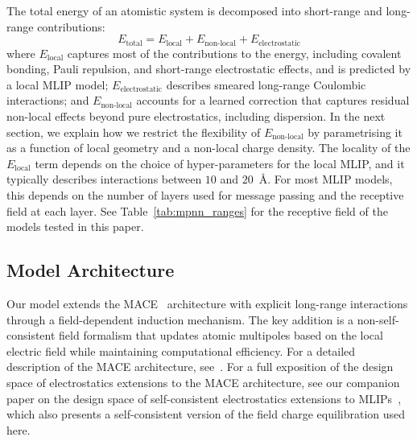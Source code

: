 \documentclass[aps,%
superscriptaddress,
 amsmath,amssymb,
floatfix,
twocolumn
]{revtex4-2}
\begin{document}
The total energy of an atomistic system is decomposed into short-range and long-range contributions:
\begin{equation}
E_{\text{total}} = E_{\text{local}} + E_{\text{non-local}} + E_{\text{electrostatic}}
\end{equation}
where $E_{\text{local}}$ captures most of the contributions to the energy, including covalent bonding, Pauli repulsion, and short-range electrostatic effects, and is predicted by a local MLIP model; $E_{\text{electrostatic}}$ describes smeared long-range Coulombic interactions; and $E_{\text{non-local}}$ accounts for a learned correction that captures residual non-local effects beyond pure electrostatics, including dispersion. In the next section, we explain how we restrict the flexibility of $E_{\text{non-local}}$ by parametrising it as a function of local geometry and a non-local charge density. The locality of the $E_{\text{local}}$ term depends on the choice of hyper-parameters for the local MLIP, and it typically describes interactions between $10$ and $20$~\AA. For most MLIP models, this depends on the number of layers used for message passing and the receptive field at each layer. See Table~\ref{tab:mpnn_ranges} for the receptive field of the models tested in this paper.

\subsection{Model Architecture}

Our model extends the MACE~\cite{batatia_mace_2023} architecture with explicit long-range interactions through a field-dependent induction mechanism. The key addition is a non-self-consistent field formalism that updates atomic multipoles based on the local electric field while maintaining computational efficiency. For a detailed description of the MACE architecture, see~\cite{batatia_mace_2023, Kovcs2023}. For a full exposition of the design space of electrostatics extensions to the MACE architecture, see our companion paper on the design space of self-consistent electrostatics extensions to MLIPs~\cite{Baldwin2026SCF}, which also presents a self-consistent version of the field charge equilibration used here.
%
\end{document}
